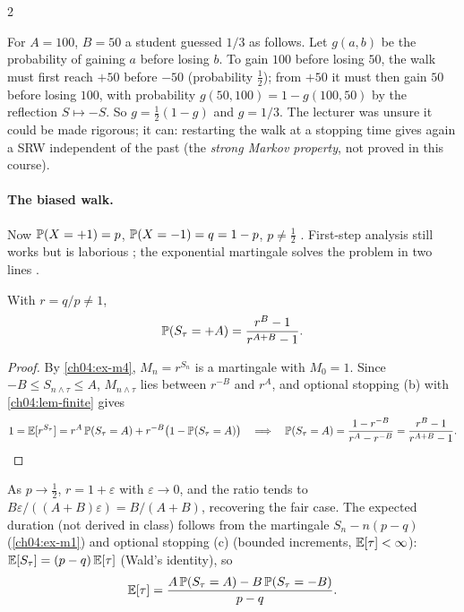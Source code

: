 \begin{paracol}{2}
\begin{remark}
For $A=100$, $B=50$ a student guessed $1/3$ as follows. Let $g(a,b)$ be the probability of gaining $a$ before losing
$b$. To gain $100$ before losing $50$, the walk must first reach $+50$ before $-50$ (probability $\tfrac12$); from $+50$
it must then gain $50$ before losing $100$, with probability $g(50,100)=1-g(100,50)$ by the reflection
$S\mapsto-S$. So $g=\tfrac12(1-g)$ and $g=1/3$. The lecturer was unsure it could be made rigorous; it can: restarting the
walk at a stopping time gives again a SRW independent of the past (the \emph{strong Markov property}, not proved in
this course).
\end{remark}

\paragraph{The biased walk.} Now $\mathbb{P}(X=+1)=p$, $\mathbb{P}(X=-1)=q=1-p$, $p\ne\tfrac12$ . First-step
analysis still works but is laborious ; the exponential martingale solves the problem in two lines
.

\begin{proposition}\label{ch04:prop-biased}
With $r=q/p\ne1$,
\[
  \mathbb{P}(S_\tau=+A)=\frac{r^B-1}{r^{A+B}-1}.
\]
\end{proposition}
\begin{proof}
By \cref{ch04:ex-m4}, $M_n=r^{S_n}$ is a martingale with $M_0=1$. Since $-B\le S_{n\wedge\tau}\le A$, $M_{n\wedge\tau}$ lies
between $r^{-B}$ and $r^{A}$, and optional stopping (b) with \cref{ch04:lem-finite} gives 
\[
  1=\mathbb{E}[r^{S_\tau}]=r^{A}\,\mathbb{P}(S_\tau=A)+r^{-B}\bigl(1-\mathbb{P}(S_\tau=A)\bigr)
  \quad\Longrightarrow\quad \mathbb{P}(S_\tau=A)=\frac{1-r^{-B}}{r^A-r^{-B}}=\frac{r^B-1}{r^{A+B}-1}.\qedhere
\]
\end{proof}
As $p\to\tfrac12$, $r=1+\varepsilon$ with $\varepsilon\to0$, and the ratio tends to $B\varepsilon/((A+B)\varepsilon)=B/(A+B)$,
recovering the fair case. The expected duration (not derived in class) follows from the martingale
$S_n-n(p-q)$ (\cref{ch04:ex-m1}) and optional stopping (c) (bounded increments, $\mathbb{E}[\tau]<\infty$):
$\mathbb{E}[S_\tau]=(p-q)\,\mathbb{E}[\tau]$ (Wald's identity), so
\[
  \mathbb{E}[\tau]=\frac{A\,\mathbb{P}(S_\tau=A)-B\,\mathbb{P}(S_\tau=-B)}{p-q}.
\]


\end{paracol}
